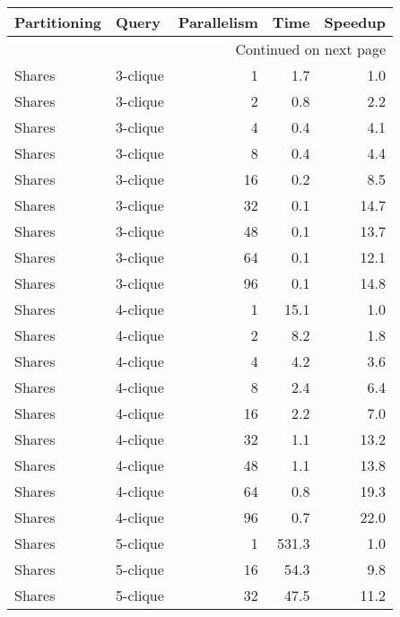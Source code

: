 \begin{longtable}{llr|rr}

\toprule
  Partitioning &     Query &  Parallelism &   Time &  Speedup \\
\midrule
\endhead
\midrule
\multicolumn{5}{r}{{Continued on next page}} \\
\midrule
\endfoot

\bottomrule
\endlastfoot
        Shares &  3-clique &            1 &    1.7 &      1.0 \\
        Shares &  3-clique &            2 &    0.8 &      2.2 \\
        Shares &  3-clique &            4 &    0.4 &      4.1 \\
        Shares &  3-clique &            8 &    0.4 &      4.4 \\
        Shares &  3-clique &           16 &    0.2 &      8.5 \\
        Shares &  3-clique &           32 &    0.1 &     14.7 \\
        Shares &  3-clique &           48 &    0.1 &     13.7 \\
        Shares &  3-clique &           64 &    0.1 &     12.1 \\
        Shares &  3-clique &           96 &    0.1 &     14.8 \\
        Shares &  4-clique &            1 &   15.1 &      1.0 \\
        Shares &  4-clique &            2 &    8.2 &      1.8 \\
        Shares &  4-clique &            4 &    4.2 &      3.6 \\
        Shares &  4-clique &            8 &    2.4 &      6.4 \\
        Shares &  4-clique &           16 &    2.2 &      7.0 \\
        Shares &  4-clique &           32 &    1.1 &     13.2 \\
        Shares &  4-clique &           48 &    1.1 &     13.8 \\
        Shares &  4-clique &           64 &    0.8 &     19.3 \\
        Shares &  4-clique &           96 &    0.7 &     22.0 \\
        Shares &  5-clique &            1 &  531.3 &      1.0 \\
        Shares &  5-clique &           16 &   54.3 &      9.8 \\
        Shares &  5-clique &           32 &   47.5 &     11.2 \\

\end{longtable}
